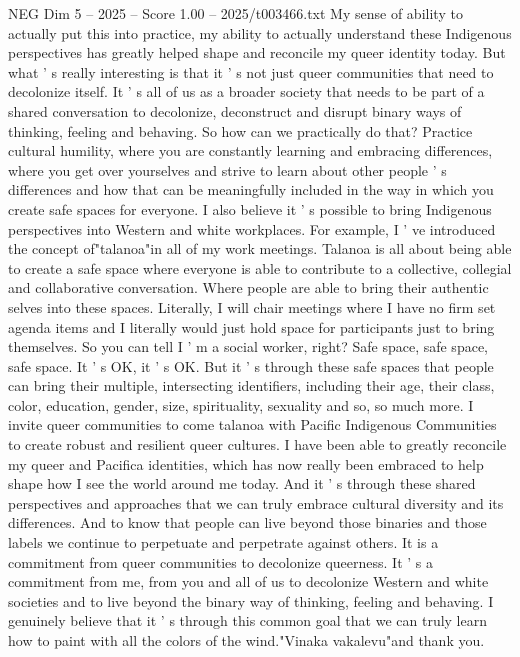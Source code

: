 \begin{textsample}{NEG Dim 5 – 2025 – Score 1.00 – 2025/t003466.txt}
My sense of ability to actually put this into practice, my ability to actually understand these Indigenous perspectives has greatly helped shape and reconcile my queer identity today.
But what ' s really interesting is that it ' s not just queer communities that need to decolonize itself.
It ' s all of us as a broader society that needs to be part of a shared conversation to decolonize, deconstruct and disrupt binary ways of thinking, feeling and behaving.
So how can we practically do that?
Practice cultural humility, where you are constantly learning and embracing differences, where you get over yourselves and strive to learn about other people ' s differences and how that can be meaningfully included in the way in which you create safe spaces for everyone.
I also believe it ' s possible to bring Indigenous perspectives into Western and white workplaces.
For example, I ' ve introduced the concept of"talanoa"in all of my work meetings.
Talanoa is all about being able to create a safe space where everyone is able to contribute to a collective, collegial and collaborative conversation.
Where people are able to bring their authentic selves into these spaces.
Literally, I will chair meetings where I have no firm set agenda items and I literally would just hold space for participants just to bring themselves.
So you can tell I ' m a social worker, right?
Safe space, safe space, safe space.
It ' s OK, it ' s OK.
But it ' s through these safe spaces that people can bring their multiple, intersecting identifiers, including their age, their class, color, education, gender, size, spirituality, sexuality and so, so much more.
I invite queer communities to come talanoa with Pacific Indigenous Communities to create robust and resilient queer cultures.
I have been able to greatly reconcile my queer and Pacifica identities, which has now really been embraced to help shape how I see the world around me today.
And it ' s through these shared perspectives and approaches that we can truly embrace cultural diversity and its differences.
And to know that people can live beyond those binaries and those labels we continue to perpetuate and perpetrate against others.
It is a commitment from queer communities to decolonize queerness.
It ' s a commitment from me, from you and all of us to decolonize Western and white societies and to live beyond the binary way of thinking, feeling and behaving.
I genuinely believe that it ' s through this common goal that we can truly learn how to paint with all the colors of the wind."Vinaka vakalevu"and thank you.

\end{textsample}
